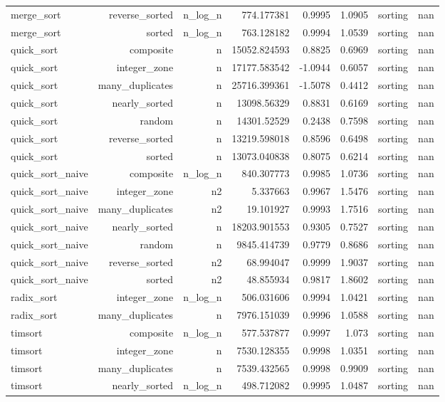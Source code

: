 \begin{table}[htbp]
\begin{tabular}{lrrrrrrr}
merge_sort & reverse_sorted & n_log_n & 774.177381 & 0.9995 & 1.0905 & sorting & nan \\
merge_sort & sorted & n_log_n & 763.128182 & 0.9994 & 1.0539 & sorting & nan \\
quick_sort & composite & n & 15052.824593 & 0.8825 & 0.6969 & sorting & nan \\
quick_sort & integer_zone & n & 17177.583542 & -1.0944 & 0.6057 & sorting & nan \\
quick_sort & many_duplicates & n & 25716.399361 & -1.5078 & 0.4412 & sorting & nan \\
quick_sort & nearly_sorted & n & 13098.56329 & 0.8831 & 0.6169 & sorting & nan \\
quick_sort & random & n & 14301.52529 & 0.2438 & 0.7598 & sorting & nan \\
quick_sort & reverse_sorted & n & 13219.598018 & 0.8596 & 0.6498 & sorting & nan \\
quick_sort & sorted & n & 13073.040838 & 0.8075 & 0.6214 & sorting & nan \\
quick_sort_naive & composite & n_log_n & 840.307773 & 0.9985 & 1.0736 & sorting & nan \\
quick_sort_naive & integer_zone & n2 & 5.337663 & 0.9967 & 1.5476 & sorting & nan \\
quick_sort_naive & many_duplicates & n2 & 19.101927 & 0.9993 & 1.7516 & sorting & nan \\
quick_sort_naive & nearly_sorted & n & 18203.901553 & 0.9305 & 0.7527 & sorting & nan \\
quick_sort_naive & random & n & 9845.414739 & 0.9779 & 0.8686 & sorting & nan \\
quick_sort_naive & reverse_sorted & n2 & 68.994047 & 0.9999 & 1.9037 & sorting & nan \\
quick_sort_naive & sorted & n2 & 48.855934 & 0.9817 & 1.8602 & sorting & nan \\
radix_sort & integer_zone & n_log_n & 506.031606 & 0.9994 & 1.0421 & sorting & nan \\
radix_sort & many_duplicates & n & 7976.151039 & 0.9996 & 1.0588 & sorting & nan \\
timsort & composite & n_log_n & 577.537877 & 0.9997 & 1.073 & sorting & nan \\
timsort & integer_zone & n & 7530.128355 & 0.9998 & 1.0351 & sorting & nan \\
timsort & many_duplicates & n & 7539.432565 & 0.9998 & 0.9909 & sorting & nan \\
timsort & nearly_sorted & n_log_n & 498.712082 & 0.9995 & 1.0487 & sorting & nan \\

\end{tabular}
\end{table}
